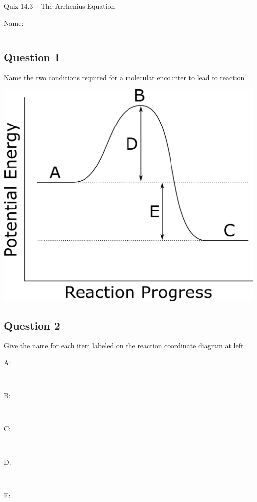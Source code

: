 \documentclass[11pt, letterpaper]{memoir}
\begin{document}
	\begin{center}
		{\large	Quiz 14.3 -- The Arrhenius Equation}
	\end{center}
	{\large Name: \rule[-1mm]{4in}{.1pt} 
	
	\noindent
	
	\subsection*{Question 1}
	Name the two conditions required for a molecular encounter to lead to reaction
	
	\vspace{3em}
	\begin{minipage}{0.4\linewidth}
		\noindent \hspace{-2em} \includegraphics[width=1.1\linewidth]{Simple_Rx_Coordinate} 
	\end{minipage}\hspace{1em}
	\begin{minipage}{0.49\linewidth}
		\subsection*{Question 2}
		Give the name for each item labeled on the reaction coordinate diagram at left
		\begin{description}
			\item[A:] ~
			\item[B:] ~
			\item[C:] ~
			\item[D:] ~
			\item[E:] ~
		\end{description}
	\end{minipage}
	
}
\end{document}

